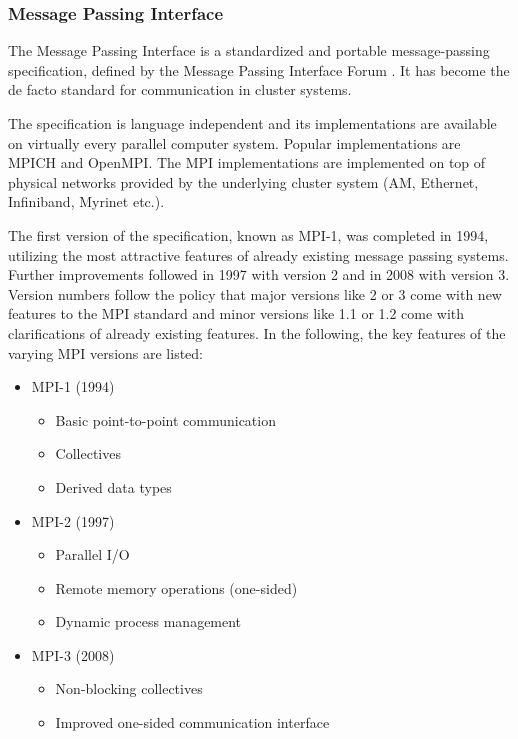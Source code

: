 \subsubsection{Message Passing Interface }
\label{sec:mpi}
The Message Passing Interface is a standardized and portable
message-passing specification, defined by the Message Passing
Interface Forum \cite{ref:mpi_specification}. It has become the
de facto standard for communication in cluster systems.

The specification is language independent and its implementations are
available on virtually every parallel computer system.  Popular
implementations are MPICH and OpenMPI.  The MPI implementations are
implemented on top of physical networks provided by the underlying
cluster system (AM, Ethernet, Infiniband, Myrinet etc.).

The first version of the specification, known as MPI-1, was completed
in 1994, utilizing the most attractive features of already
existing message passing systems.  Further improvements followed in 1997
with version 2 and in 2008 with version 3. Version numbers follow
the policy that major versions like 2 or 3 come with new
features to the MPI standard and minor versions like 1.1 or
1.2 come with clarifications of already existing features. In
the following, the key features of the varying MPI versions are listed:

\begin{itemize}
  \item MPI-1 (1994)
    \begin{itemize}
      \item Basic point-to-point communication
      \item Collectives
      \item Derived data types
    \end{itemize}
  \item MPI-2 (1997)
    \begin{itemize}
      \item Parallel I/O
      \item Remote memory operations (one-sided)
      \item Dynamic process management
    \end{itemize}
  \item MPI-3 (2008)
    \begin{itemize}
      \item Non-blocking collectives
      \item Improved one-sided communication interface
    \end{itemize}
\end{itemize}


